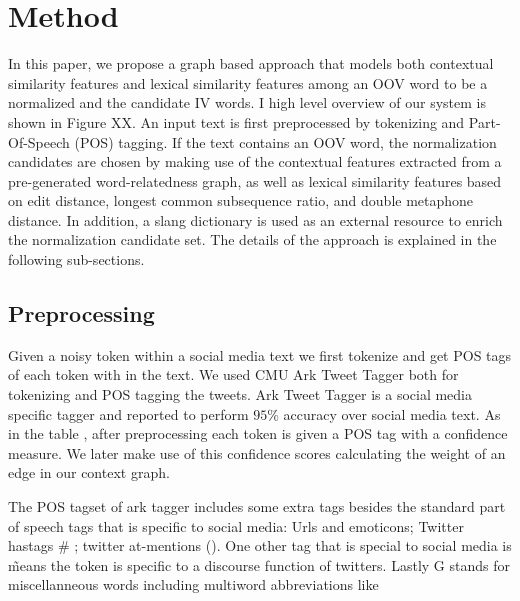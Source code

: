 \section{Method}
\label{sec:graph}



In this paper, we propose a graph based approach that models both contextual similarity features and lexical similarity features among an OOV word to be a normalized and the candidate IV words. I high level overview of our system is shown in Figure XX. An input text is first preprocessed by tokenizing and Part-Of-Speech (POS) tagging. If the text contains an OOV word, the normalization candidates are chosen by making use of the contextual features extracted from a pre-generated word-relatedness graph, as well as lexical similarity features based on edit distance, longest common subsequence ratio, and double metaphone distance. In addition, a slang dictionary is used as an external resource to enrich the normalization candidate set. The details of the approach is explained in the following sub-sections.


\subsection{}
\subsection{Preprocessing}

Given a noisy token within a social media text we first tokenize and get POS tags of each token with in the text. We used CMU Ark Tweet Tagger\cite{DBLP:conf/naacl/OwoputiODGSS13}\cite{Gimpel:2011:PTT:2002736.2002747} both for tokenizing and POS tagging the tweets. Ark Tweet Tagger is a social media specific tagger and reported to perform $95\%$ accuracy over social media text. As in the table \label{tab:postags}, after preprocessing each token is given a POS tag with a confidence measure. We later make use of this confidence scores calculating the weight of an edge in our context graph.

The POS tagset of ark tagger includes some extra tags besides the standard part of speech tags that is specific to social media: Urls and emoticons; Twitter hastags \# ; twitter at-mentions (\@). One other tag that is special to social media is \~ means the token is specific to a discourse function of twitters. Lastly G stands for miscellanneous words including multiword abbreviations like

